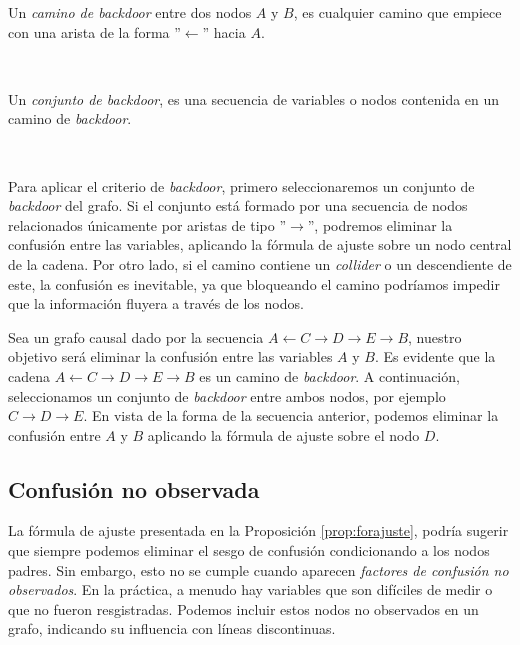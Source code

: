 \documentclass[oneside,openright,titlepage,numbers=noenddot,openany,headinclude,footinclude=true,
cleardoublepage=empty,abstractoff,BCOR=5mm,paper=a4,fontsize=12pt,main=spanish]{scrreprt}
\begin{document}
\begin{definition}
Un \textit{camino de backdoor} entre dos nodos $A$ y $B$, es cualquier camino que empiece con una arista de la forma ''$\leftarrow$'' hacia $A$.
\end{definition}\

\begin{definition}
Un \textit{conjunto de backdoor}, es una secuencia de variables o nodos contenida en un camino de \textit{backdoor}.
\end{definition}\

Para aplicar el criterio de \textit{backdoor}, primero seleccionaremos un conjunto de \textit{backdoor} del grafo. Si el conjunto está formado por una secuencia de nodos relacionados únicamente por aristas de tipo ''$\to$'', podremos eliminar la confusión entre las variables, aplicando la fórmula de ajuste sobre un nodo central de la cadena. Por otro lado, si el camino contiene un \textit{collider} o un descendiente de este, la confusión es inevitable, ya que bloqueando el camino podríamos impedir que la información fluyera a través de los nodos.

\begin{example}
Sea un grafo causal dado por la secuencia $A \leftarrow C \to D \to E \to B$, nuestro objetivo será eliminar la confusión entre las variables $A$ y $B$. Es evidente que la cadena $A \leftarrow C \to D \to E \to B$ es un camino de \textit{backdoor}. A continuación, seleccionamos un conjunto de \textit{backdoor} entre ambos nodos, por ejemplo $C \to D \to E$. En vista de la forma de la secuencia anterior, podemos eliminar la confusión entre $A$ y $B$ aplicando la fórmula de ajuste sobre el nodo $D$.
\end{example}

\subsection*{Confusión no observada}

La fórmula de ajuste presentada en la Proposición \ref{prop:forajuste}, podría sugerir que siempre podemos eliminar el sesgo de confusión condicionando a los nodos padres. Sin embargo, esto no se cumple cuando aparecen \textit{factores de confusión no observados}. En la práctica, a menudo hay variables que son difíciles de medir o que no fueron resgistradas. Podemos incluir estos nodos no observados en un grafo, indicando su influencia con líneas discontinuas.\\
\end{document}
